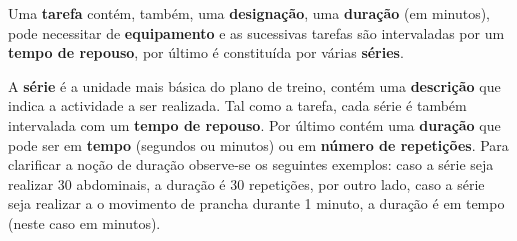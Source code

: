 \hspace{5mm} Uma \textbf{tarefa} contém, também, uma \textbf{designação}, uma \textbf{duração} (em minutos), pode necessitar de \textbf{equipamento} e as sucessivas tarefas são intervaladas por um \textbf{tempo de repouso}, por último é constituída por várias \textbf{séries}.

\hspace{5mm} A \textbf{série} é a unidade mais básica do plano de treino, contém uma \textbf{descrição} que indica a actividade a ser realizada. Tal como a tarefa, cada série é também intervalada com um \textbf{tempo de repouso}. Por último contém uma \textbf{duração} que pode ser em \textbf{tempo} (segundos ou minutos) ou em \textbf{número de repetições}. Para clarificar a noção de duração observe-se os seguintes exemplos: caso a série seja realizar 30 abdominais, a duração é 30 repetições, por outro lado, caso a série seja realizar a o movimento de prancha durante 1 minuto, a duração é em tempo (neste caso em minutos). 